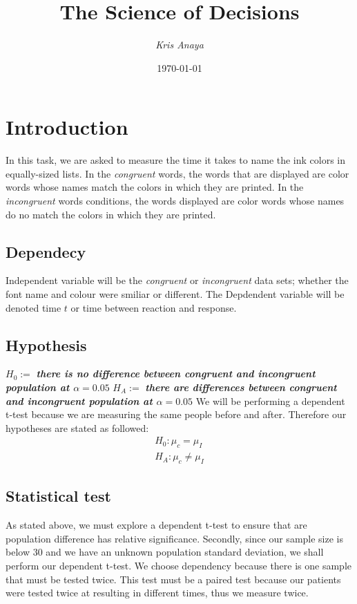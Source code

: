 \documentclass[8pt]{article}
\newcommand{\8}{\bar}
\begin{document}
 
\title{The Science of Decisions} 
\author{\textit{Kris Anaya}}
\date{\today} 
\maketitle

\section{Introduction}
In this task, we are asked to measure the time it takes to name the ink colors in equally-sized lists. In the \textit{congruent} words, the words that are displayed are color words whose names match the colors in which they are printed. In the \textit{incongruent} words conditions, the words displayed are color words whose names do no match the colors in which they are printed.
\subsection{Dependecy} 
Independent variable will be the \textit{congruent} or \textit{incongruent} data sets; whether the font name and colour were smiliar or different. The Depdendent variable will be denoted time $t$ or time between reaction and response. 
\subsection{Hypothesis} 
$H_{0} :=$ \textbf{\textit{there is no difference between \textit{congruent} and \textit{incongruent} population at $\alpha =0.05$}} \newline
$H_{A} :=$ \textbf{\textit{ there are differences between \textit{congruent} and \textit{incongruent} population at $\alpha = 0.05$}} \newline \newline
We will be performing a dependent t-test because we are measuring the same people before and after. Therefore our hypotheses are stated as followed: 
\begin{equation} 
\begin{split} 
H_{0}: \mu_{c} = \mu_{I} \\
H_{A}: \mu_{c} \not= \mu_{I} 
\end{split}
\end{equation} 
\subsection{Statistical test} 
As stated above, we must explore a dependent t-test to ensure that are population difference has relative significance. Secondly, since our sample size is below $30$ and we have an unknown population standard deviation, we shall perform our dependent t-test. We choose dependency because there is one sample that must be tested twice. This test must be a paired test because our patients were tested twice at resulting in different times, thus we measure twice. 
\end{document}
